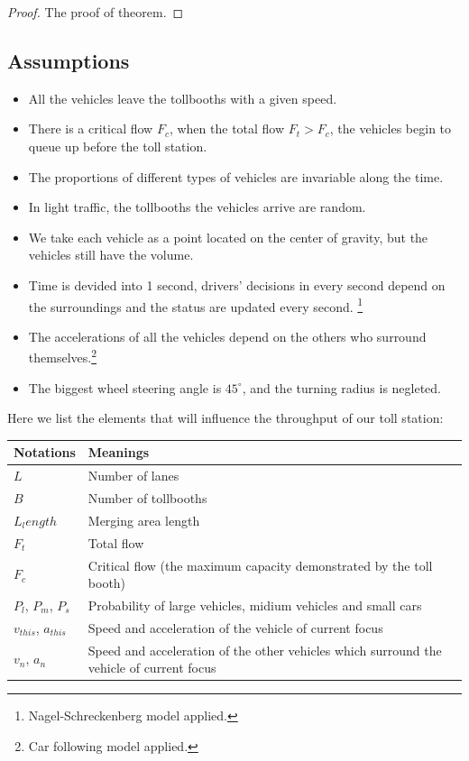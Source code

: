 \documentclass{mcmthesis}
\begin{document}
\begin{proof}
The proof of theorem.
\end{proof}

\subsection{Assumptions}

\begin{itemize}
	\item All the vehicles leave the tollbooths with a given speed.
	\item There is a critical flow $F_c$, when the total flow  $F_t>F_c$, the vehicles begin to queue up before the toll station.
	\item The proportions of different types of vehicles are invariable along the time.
	\item In light traffic, the tollbooths the vehicles arrive are random.
	\item We take each vehicle as a point located on the center of gravity, but the vehicles still have the volume.
    \item Time is devided into 1 second, drivers' decisions in every second depend on the surroundings and the status are updated every second. \footnote{Nagel-Schreckenberg model applied.}
	\item The accelerations of all the vehicles depend on the others who surround themselves.\footnote{Car following model applied.}
	\item The biggest wheel steering angle is $45^{\circ}$, and the turning radius is negleted.
\end{itemize}



Here we list the elements that will influence the throughput of our toll station:

\begin{tabular}{|m{7cm}<{\centering}|p{7cm}<{\centering}|}
	\hline
	Notations & Meanings \\
	\hline
	 $L$ &  Number of lanes \\
	\hline
	 $B$ &  Number of tollbooths \\
  \hline
   $L_length$ & Merging area length \\
	\hline
   $F_t$ & Total flow \\
  \hline
   $F_c$ & Critical flow (the maximum capacity demonstrated by the toll booth) \\
  \hline
   $P_l$,  $P_m$, $P_s$ & Probability of large vehicles, midium vehicles and small cars\\
  \hline
   $v_{this}$, $a_{this}$ & Speed and acceleration of the vehicle of current focus\\
  \hline
   $v_n$, $a_n$ &  Speed and acceleration of the other vehicles which surround the vehicle of current focus\\
  \hline
     
\end{tabular}
\end{document}
